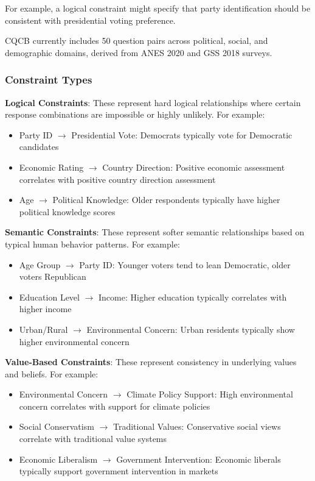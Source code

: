 \documentclass[sigconf, anonymous]{acmart}
\begin{document}
For example, a logical constraint might specify that party identification should be consistent with presidential voting preference.

CQCB currently includes 50 question pairs across political, social, and demographic domains, derived from ANES 2020 and GSS 2018 surveys.

\subsubsection{Constraint Types}

\textbf{Logical Constraints}: These represent hard logical relationships where certain response combinations are impossible or highly unlikely. For example:
\begin{itemize}
    \item Party ID $\rightarrow$ Presidential Vote: Democrats typically vote for Democratic candidates
    \item Economic Rating $\rightarrow$ Country Direction: Positive economic assessment correlates with positive country direction assessment
    \item Age $\rightarrow$ Political Knowledge: Older respondents typically have higher political knowledge scores
\end{itemize}

\textbf{Semantic Constraints}: These represent softer semantic relationships based on typical human behavior patterns. For example:
\begin{itemize}
    \item Age Group $\rightarrow$ Party ID: Younger voters tend to lean Democratic, older voters Republican
    \item Education Level $\rightarrow$ Income: Higher education typically correlates with higher income
    \item Urban/Rural $\rightarrow$ Environmental Concern: Urban residents typically show higher environmental concern
\end{itemize}

\textbf{Value-Based Constraints}: These represent consistency in underlying values and beliefs. For example:
\begin{itemize}
    \item Environmental Concern $\rightarrow$ Climate Policy Support: High environmental concern correlates with support for climate policies
    \item Social Conservatism $\rightarrow$ Traditional Values: Conservative social views correlate with traditional value systems
    \item Economic Liberalism $\rightarrow$ Government Intervention: Economic liberals typically support government intervention in markets
\end{itemize}
\end{document}
